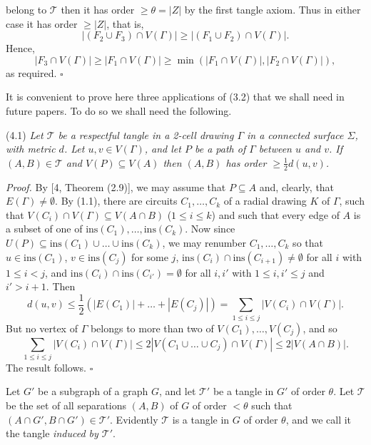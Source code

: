 \noindent belong to $\mathscr{T}$ then it has order $\ge \theta = |Z|$ by the first tangle axiom. Thus in either case it has order $\ge |Z|$, that is,
\begin{equation*}
|(F_2 \cup F_3) \cap V(\Gamma)| \ge |(F_1 \cup F_2) \cap V(\Gamma)|.
\end{equation*}
Hence,
\begin{equation*}
|F_3 \cap V(\Gamma)| \ge |F_1 \cap V(\Gamma)| \ge \min(|F_1 \cap V(\Gamma)|, |F_2 \cap V(\Gamma)|),
\end{equation*}
as required. $\square$


It is convenient to prove here three applications of (3.2) that we shall need in future papers. To do so we shall need the following.

\stmt
(4.1) \textit{Let $\mathscr{T}$ be a respectful tangle in a 2-cell drawing $\Gamma$ in a connected surface $\Sigma$, with metric $d$. Let $u, v \in V(\Gamma)$, and let $P$ be a path of $\Gamma$ between $u$ and $v$. If $(A, B) \in \mathscr{T}$ and $V(P) \subseteq V(A)$ then $(A, B)$ has order $\ge \frac{1}{2} d(u, v)$.}

\textit{Proof.} By [4, Theorem (2.9)], we may assume that $P \subseteq A$ and, clearly, that $E(\Gamma) \ne \emptyset$. By (1.1), there are circuits $C_1, \dots, C_k$ of a radial drawing $K$ of $\Gamma$, such that $V(C_i) \cap V(\Gamma) \subseteq V(A \cap B)$ ($1 \le i \le k$) and such that every edge of $A$ is a subset of one of $\text{ins}(C_1), \dots, \text{ins}(C_k)$. Now since $U(P) \subseteq \text{ins}(C_1) \cup \dots \cup \text{ins}(C_k)$, we may renumber $C_1, \dots, C_k$ so that $u \in \text{ins}(C_1)$, $v \in \text{ins}(C_j)$ for some $j$, $\text{ins}(C_i) \cap \text{ins}(C_{i+1}) \ne \emptyset$ for all $i$ with $1 \le i < j$, and $\text{ins}(C_i) \cap \text{ins}(C_{i'}) = \emptyset$ for all $i, i'$ with $1 \le i, i' \le j$ and $i' > i + 1$. Then
\begin{equation*}
d(u, v) \le \frac{1}{2} (|E(C_1)| + \dots + |E(C_j)|) = \sum_{1 \le i \le j} |V(C_i) \cap V(\Gamma)|.
\end{equation*}
But no vertex of $\Gamma$ belongs to more than two of $V(C_1), \dots, V(C_j)$, and so
\begin{equation*}
\sum_{1 \le i \le j} |V(C_i) \cap V(\Gamma)| \le 2 |V(C_1 \cup \dots \cup C_j) \cap V(\Gamma)| \le 2 |V(A \cap B)|.
\end{equation*}
The result follows. $\square$

Let $G'$ be a subgraph of a graph $G$, and let $\mathscr{T}'$ be a tangle in $G'$ of order $\theta$. Let $\mathscr{T}$ be the set of all separations $(A, B)$ of $G$ of order $< \theta$ such that $(A \cap G', B \cap G') \in \mathscr{T}'$. Evidently $\mathscr{T}$ is a tangle in $G$ of order $\theta$, and we call it the tangle \textit{induced by $\mathscr{T}'$}.
